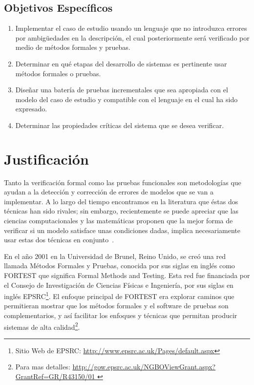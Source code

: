 \subsection{Objetivos Espec\'ificos}
\begin{enumerate}
\item Implementar el caso de estudio usando un lenguaje que no introduzca 
errores por ambig\"uedades en la descripci\'on, el cual posteriormente ser\'a 
verificado por medio de m\'etodos formales y pruebas.
\item Determinar en qu\'e etapas del desarrollo de sistemas es pertinente usar 
m\'etodos formales o pruebas.
\item Dise\~nar una bater\'ia de pruebas incrementales que sea apropiada con 
el modelo del caso de estudio y compatible con el lenguaje en el cual ha sido 
expresado.
\item Determinar las propiedades cr\'iticas del sistema que se desea verificar.
\end{enumerate}

\section{Justificaci\'on}

Tanto la verificaci\'on formal como las pruebas funcionales son metodolog\'ias 
que ayudan a la detecci\'on y correcci\'on de errores de modelos que se van a 
implementar. A lo largo del tiempo encontramos en la literatura que \'estas dos 
t\'ecnicas han sido rivales; sin embargo, recientemente se puede apreciar 
que las ciencias computacionales y las matem\'aticas proponen que la mejor forma 
de verificar si un modelo satisface unas condiciones dadas, implica 
necesariamente usar estas dos t\'ecnicas en conjunto~\cite{Gaudel1996}. 

En el a\~no 2001 en la Universidad de Brunel, Reino Unido, se cre\'o una red 
llamada M\'etodos Formales y Pruebas, conocida por sus siglas en ingl\'es como 
FORTEST que significa Formal Methods and Testing. Esta red fue financiada por el 
Consejo de Investigaci\'on de Ciencias F\'isicas e Ingenier\'ia, por sus siglas 
en ingl\'es EPSRC\footnote{Sitio Web de 
EPSRC: \url{http://www.epsrc.ac.uk/Pages/default.aspx}}. El enfoque principal 
de 
FORTEST era explorar caminos que 
permitieran mostrar que los m\'etodos formales y el software de pruebas son 
complementarios, y as\'i facilitar los enfoques y t\'ecnicas 	que permitan 
producir sistemas de alta 
calidad\footnote{Para mas detalles:
\url{http://gow.epsrc.ac.uk/NGBOViewGrant.aspx?GrantRef=GR/R43150/01 
}}.

